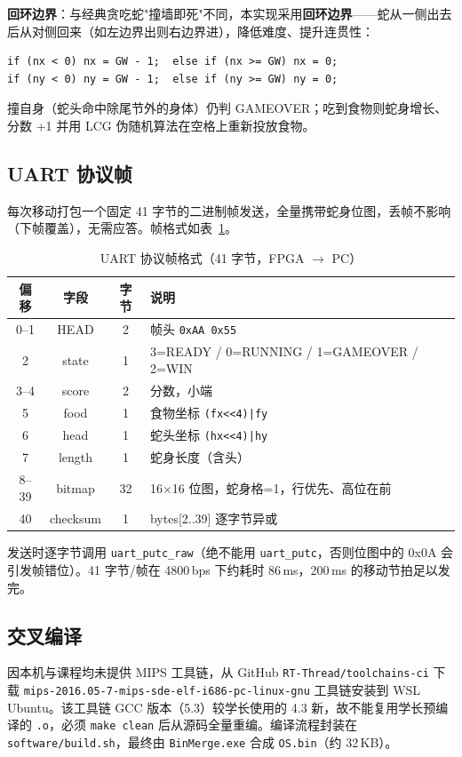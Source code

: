 \textbf{回环边界}：与经典贪吃蛇"撞墙即死"不同，本实现采用\textbf{回环边界}——蛇从一侧出去后从对侧回来（如左边界出则右边界进），降低难度、提升连贯性：

\begin{lstlisting}[style=c, caption={回环边界处理（step\_snake）}]
if (nx < 0) nx = GW - 1;  else if (nx >= GW) nx = 0;
if (ny < 0) ny = GW - 1;  else if (ny >= GW) ny = 0;
\end{lstlisting}

撞自身（蛇头命中除尾节外的身体）仍判 GAMEOVER；吃到食物则蛇身增长、分数 +1 并用 LCG 伪随机算法在空格上重新投放食物。

\subsection{UART 协议帧}

每次移动打包一个固定 41 字节的二进制帧发送，全量携带蛇身位图，丢帧不影响（下帧覆盖），无需应答。帧格式如表~\ref{tab:frame}。

\begin{table}[H]
    \centering
    \caption{UART 协议帧格式（41 字节，FPGA $\rightarrow$ PC）}
    \label{tab:frame}
    \begin{tabular}{cccp{6.2cm}}
        \toprule
        \textbf{偏移} & \textbf{字段} & \textbf{字节} & \textbf{说明} \\
        \midrule
        0--1 & HEAD & 2 & 帧头 \texttt{0xAA 0x55} \\
        2 & state & 1 & 3=READY / 0=RUNNING / 1=GAMEOVER / 2=WIN \\
        3--4 & score & 2 & 分数，小端 \\
        5 & food & 1 & 食物坐标 \texttt{(fx<<4)|fy} \\
        6 & head & 1 & 蛇头坐标 \texttt{(hx<<4)|hy} \\
        7 & length & 1 & 蛇身长度（含头） \\
        8--39 & bitmap & 32 & 16$\times$16 位图，蛇身格=1，行优先、高位在前 \\
        40 & checksum & 1 & bytes[2..39] 逐字节异或 \\
        \bottomrule
    \end{tabular}
\end{table}

发送时逐字节调用 \texttt{uart\_putc\_raw}（绝不能用 \texttt{uart\_putc}，否则位图中的 0x0A 会引发帧错位）。41 字节/帧在 4800\,bps 下约耗时 86\,ms，200\,ms 的移动节拍足以发完。

\subsection{交叉编译}

因本机与课程均未提供 MIPS 工具链，从 GitHub \texttt{RT-Thread/toolchains-ci} 下载 \texttt{mips-2016.05-7-mips-sde-elf-i686-pc-linux-gnu} 工具链安装到 WSL Ubuntu。该工具链 GCC 版本（5.3）较学长使用的 4.3 新，故不能复用学长预编译的 \texttt{.o}，必须 \texttt{make clean} 后从源码全量重编。编译流程封装在 \texttt{software/build.sh}，最终由 \texttt{BinMerge.exe} 合成 \texttt{OS.bin}（约 32\,KB）。
